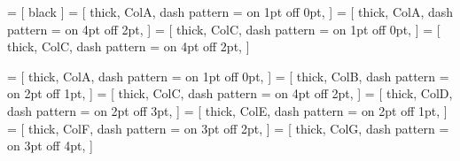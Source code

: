



 = [
black
]
 = [
thick, ColA, dash pattern = {on 1pt off 0pt},
]
 = [
thick, ColA, dash pattern = {on 4pt off 2pt},
]
 = [
thick, ColC, dash pattern = {on 1pt off 0pt},
]
 = [
thick, ColC, dash pattern = {on 4pt off 2pt},
]


 = [
thick, ColA, dash pattern = {on 1pt off 0pt},
]
 = [
thick, ColB, dash pattern = {on 2pt off 1pt},
]
 = [
thick, ColC, dash pattern = {on 4pt off 2pt},
]
 = [
thick, ColD, dash pattern = {on 2pt off 3pt},
]
 = [
thick, ColE, dash pattern = {on 2pt off 1pt},
]
 = [
thick, ColF, dash pattern = {on 3pt off 2pt},
]
 = [
thick, ColG, dash pattern = {on 3pt off 4pt},
]
